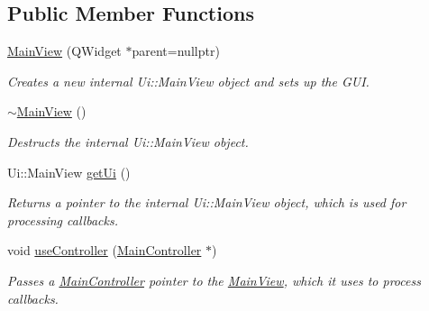 \subsection*{Public Member Functions}
\begin{DoxyCompactItemize}
\item 
\hyperlink{classMainView_a3e82d0020daca697d56361c68556d445}{Main\+View} (Q\+Widget $\ast$parent=nullptr)
\begin{DoxyCompactList}\small\item\em Creates a new internal Ui\+::\+Main\+View object and sets up the G\+UI. \end{DoxyCompactList}\item 
\mbox{\label{classMainView_a8c9f70ed683307067d3bc7cbe131d233}} 
\hyperlink{classMainView_a8c9f70ed683307067d3bc7cbe131d233}{$\sim$\+Main\+View} ()
\begin{DoxyCompactList}\small\item\em Destructs the internal Ui\+::\+Main\+View object. \end{DoxyCompactList}\item 
\mbox{\label{classMainView_aa80a128b57958154012b0e4339f479d5}} 
Ui\+::\+Main\+View \hyperlink{classMainView_aa80a128b57958154012b0e4339f479d5}{get\+Ui} ()
\begin{DoxyCompactList}\small\item\em Returns a pointer to the internal Ui\+::\+Main\+View object, which is used for processing callbacks. \end{DoxyCompactList}\item 
void \hyperlink{classMainView_a077240bb5f37693cd4764914d69b98eb}{use\+Controller} (\hyperlink{classMainController}{Main\+Controller} $\ast$)
\begin{DoxyCompactList}\small\item\em Passes a \hyperlink{classMainController}{Main\+Controller} pointer to the \hyperlink{classMainView}{Main\+View}, which it uses to process callbacks. \end{DoxyCompactList}\end{DoxyCompactItemize}
